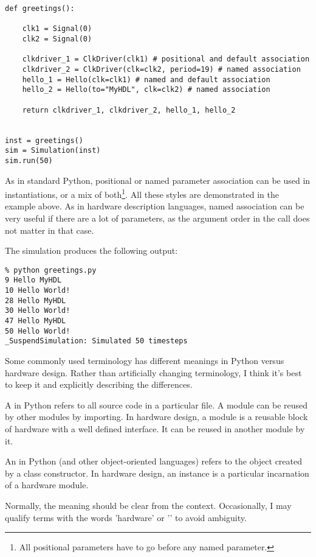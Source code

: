 \begin{verbatim}
def greetings():

    clk1 = Signal(0)
    clk2 = Signal(0)
    
    clkdriver_1 = ClkDriver(clk1) # positional and default association
    clkdriver_2 = ClkDriver(clk=clk2, period=19) # named association 
    hello_1 = Hello(clk=clk1) # named and default association
    hello_2 = Hello(to="MyHDL", clk=clk2) # named association

    return clkdriver_1, clkdriver_2, hello_1, hello_2


inst = greetings()
sim = Simulation(inst)
sim.run(50)
\end{verbatim}

As in standard Python, positional or named parameter association can
be used in instantiations, or a mix of both\footnote{All positional
parameters have to go before any named parameter.}. All these styles
are demonstrated in the example above. As in hardware description
languages, named association can be very useful if there are a lot of
parameters, as the argument order in the call does not matter in that
case.

The simulation produces the following output:

\begin{verbatim}
% python greetings.py
9 Hello MyHDL
10 Hello World!
28 Hello MyHDL
30 Hello World!
47 Hello MyHDL
50 Hello World!
_SuspendSimulation: Simulated 50 timesteps
\end{verbatim}


\begin{notice}[warning]
Some commonly used terminology has different meanings
in Python versus hardware design. Rather than artificially
changing terminology, I think it's best to keep it
and explicitly describing the differences.

A  in Python refers to all source code
in a particular file. A module can be reused by
other modules by importing. In hardware design,
%
a module is  a reusable block of hardware with
a well defined interface. It can be reused in 
another module by  it.

An  in Python (and other object-oriented
languages) refers to the object created by a
%
class constructor. In hardware design, an instance
is a particular incarnation of a hardware module.

Normally, the meaning should be clear from
the context. Occasionally, I may qualify terms 
with the words 'hardware' or '\myhdl{}' to 
avoid ambiguity.
\end{notice}


